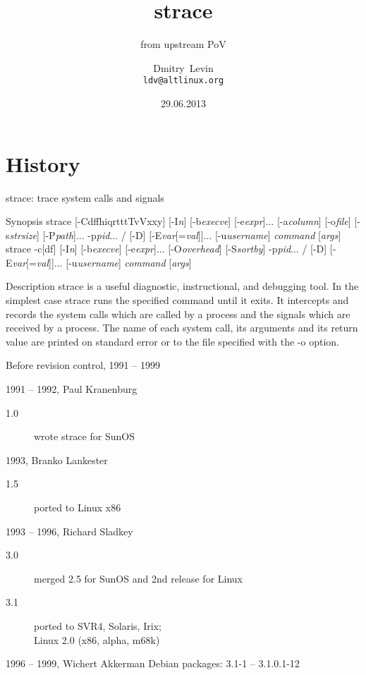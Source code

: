 \documentclass[unicode]{beamer}
\title{\Huge strace}
\subtitle{\Huge from upstream PoV}
\author{\Huge Dmitry~Levin \\ {\tt ldv@altlinux.org}}
\date{\Huge 29.06.2013}
\begin{document}
\begin{frame}
	\titlepage
\end{frame}

\section{History}

\begin{frame}{strace: trace system calls and signals}
	\begin{block}{Synopsis}
	strace  [-CdffhiqrtttTvVxxy]  [-I{\it n}]  [-b{\it execve}]  [-e{\it expr}]...   [-a{\it column}]  [-o{\it file}] [-s{\it strsize}] [-P{\it path}]... -p{\it pid}... / [-D] [-E{\it var}[={\it val}]]... [-u{\it username}] {\it command} [{\it args}] \\
	strace -c[df] [-I{\it n}] [-b{\it execve}] [-e{\it expr}]...  [-O{\it overhead}] [-S{\it sortby}] -p{\it pid}... / [-D] [-E{\it var}[={\it val}]]...  [-u{\it username}]  {\it command} [{\it args}]
	\end{block}
	\begin{block}{Description}
	strace is a useful diagnostic, instructional, and debugging tool.
	In the simplest case strace runs the specified command until it
	exits.  It intercepts and records the system calls which are called by
	a process and the signals which are received by a process.  The name of
	each system call, its arguments and its return value are printed on
	standard error or to the file specified with the -o option.
	\end{block}
\end{frame}

\begin{frame}{Before revision control, 1991 -- 1999}
	\begin{block}{1991 -- 1992, Paul Kranenburg}
	\begin{description}
		\item[1.0] wrote strace for SunOS
	\end{description}
	\end{block}
	\begin{block}{1993, Branko Lankester}
	\begin{description}
		\item[1.5] ported to Linux x86
	\end{description}
	\end{block}
	\begin{block}{1993 -- 1996, Richard Sladkey}
	\begin{description}
		\item[3.0] merged 2.5 for SunOS and 2nd release for Linux
		\item[3.1] ported to SVR4, Solaris, Irix; \\ Linux 2.0 (x86, alpha, m68k)
	\end{description}
	\end{block}
	\begin{block}{1996 -- 1999, Wichert Akkerman}
		Debian packages: 3.1-1 -- 3.1.0.1-12
	\end{block}
\end{frame}
\end{document}
